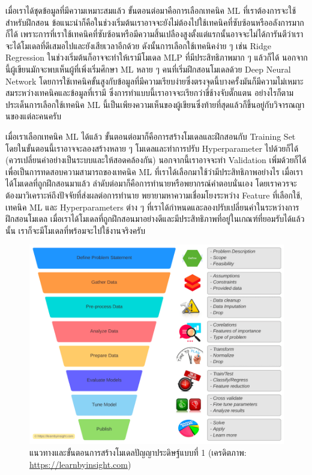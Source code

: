 เมื่อเราได้ชุดข้อมูลที่มีความเหมาะสมแล้ว ขั้นตอนต่อมาคือการเลือกเทคนิค ML ที่เราต้องการจะใช้สำหรับฝึกสอน ข้อแนะนำก็คือในช่วงเริ่มต้นเราอาจจะยังไม่ต้องไปใช้เทคนิคที่ซับซ้อนหรืออลังการมากก็ได้ เพราะการที่เราใช้เทคนิคที่ซับซ้อนหรือมีความสิ้นเปลืองสูงตั้งแต่แรกนั้นอาจจะไม่ได้การันตีว่าเราจะได้โมเดลที่ดีเสมอไปและยังเสียเวลาอีกด้วย ดังนั้นการเลือกใช้เทคนิคง่าย ๆ เช่น Ridge Regression ในช่วงเริ่มต้นก็อาจจะทำให้เรามีโมเดล MLP ที่มีประสิทธิภาพมาก ๆ แล้วก็ได้ นอกจากนี้ผู้เขียนมักจะพบเห็นผู้ที่เพิ่งเริ่มศึกษา ML หลาย ๆ คนที่เริ่มฝึกสอนโมเดลด้วย Deep Neural Network โดยการใช้เทคนิคขั้นสูงกับข้อมูลที่มีความเรียบง่ายซึ่งตรงจุดนี้บางครั้งมันก็มีความไม่เหมาะสมระหว่างเทคนิคและข้อมูลที่เรามี ซึ่งการทำแบบนี้เราอาจจะเรียกว่าขี่ช้างจับตั๊กแตน อย่างไรก็ตามประเด็นการเลือกใช้เทคนิค ML นี้เป็นเพียงความเห็นของผู้เขียนซึ่งท้ายที่สุดแล้วก็ขึ้นอยู่กับวิจารณญานของแต่ละคนครับ

เมื่อเราเลือกเทคนิค ML ได้แล้ว ขั้นตอนต่อมาก็คือการสร้างโมเดลและฝึกสอนกับ Training Set โดยในขั้นตอนนี้เราอาจจะลองสร้างหลาย ๆ โมเดลและทำการปรับ Hyperparameter ไปด้วยก็ได้ (ควรเปลี่ยนค่าอย่างเป็นระบบและให้สอดคล้องกัน) นอกจากนี้เราอาจจะทำ Validation เพิ่มด้วยก็ได้เพื่อเป็นการทดสอบความสามารถของเทคนิค ML ที่เราได้เลือกมาใช้ว่ามีประสิทธิภาพอย่างไร เมื่อเราได้โมเดลที่ถูกฝึกสอนมาแล้ว ลำดับต่อมาก็คือการทำนายหรือพยากรณ์คำตอบนั่นเอง โดยเราควรจะต้องมาวิเคราะห์ถึงปัจจัยที่ส่งผลต่อการทำนาย พยายามหาความเชื่อมโยงระหว่าง Feature ที่เลือกใช้, เทคนิค ML และ Hyperparameters ต่าง ๆ ที่เราได้กำหนดและลองปรับเปลี่ยนค่าในระหว่างการฝึกสอนโมเดล เมื่อเราได้โมเดลที่ถูกฝึกสอนมาอย่างดีและมีประสิทธิภาพที่อยู่ในเกณฑ์ที่ยอมรับได้แล้วนั้น เราก็จะมีโมเดลที่พร้อมจะไปใช้งานจริงครับ

\begin{figure}[H]
    \centering
    \includegraphics[width=\linewidth]{fig/ml_workflow.png}
    \caption{แนวทางและขั้นตอนการสร้างโมเดลปัญญาประดิษฐ์แบบที่ 1 (เครดิตภาพ: \url{https://learnbyinsight.com})}
    \label{fig:ml_workflow}
\end{figure}

